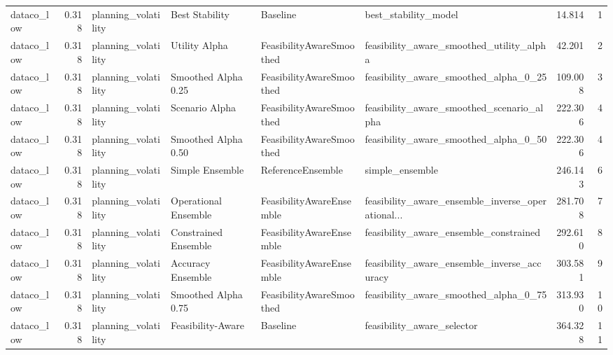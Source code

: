 \begin{table}
{\begin{tabular}{lrllllrr}
    dataco\_low &             0.318 &         planning\_volatility &        Best Stability &                  Baseline &                               best\_stability\_model &        14.814 &               1 \\
    dataco\_low &             0.318 &         planning\_volatility &         Utility Alpha &  FeasibilityAwareSmoothed &           feasibility\_aware\_smoothed\_utility\_alpha &        42.201 &               2 \\
    dataco\_low &             0.318 &         planning\_volatility &   Smoothed Alpha 0.25 &  FeasibilityAwareSmoothed &              feasibility\_aware\_smoothed\_alpha\_0\_25 &       109.008 &               3 \\
    dataco\_low &             0.318 &         planning\_volatility &        Scenario Alpha &  FeasibilityAwareSmoothed &          feasibility\_aware\_smoothed\_scenario\_alpha &       222.306 &               4 \\
    dataco\_low &             0.318 &         planning\_volatility &   Smoothed Alpha 0.50 &  FeasibilityAwareSmoothed &              feasibility\_aware\_smoothed\_alpha\_0\_50 &       222.306 &               4 \\
    dataco\_low &             0.318 &         planning\_volatility &       Simple Ensemble &         ReferenceEnsemble &                                    simple\_ensemble &       246.143 &               6 \\
    dataco\_low &             0.318 &         planning\_volatility &  Operational Ensemble &  FeasibilityAwareEnsemble &  feasibility\_aware\_ensemble\_inverse\_operational... &       281.708 &               7 \\
    dataco\_low &             0.318 &         planning\_volatility &  Constrained Ensemble &  FeasibilityAwareEnsemble &             feasibility\_aware\_ensemble\_constrained &       292.610 &               8 \\
    dataco\_low &             0.318 &         planning\_volatility &     Accuracy Ensemble &  FeasibilityAwareEnsemble &        feasibility\_aware\_ensemble\_inverse\_accuracy &       303.581 &               9 \\
    dataco\_low &             0.318 &         planning\_volatility &   Smoothed Alpha 0.75 &  FeasibilityAwareSmoothed &              feasibility\_aware\_smoothed\_alpha\_0\_75 &       313.930 &              10 \\
    dataco\_low &             0.318 &         planning\_volatility &     Feasibility-Aware &                  Baseline &                         feasibility\_aware\_selector &       364.328 &              11 \\

\end{tabular}}
\end{table}
